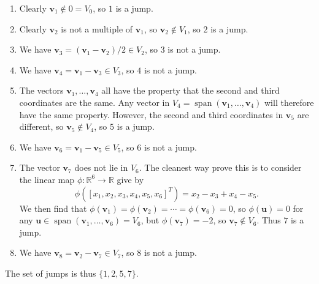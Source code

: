 \documentclass{amsart}
\newcommand{\R}         {{\mathbb{R}}}
\newcommand{\spn}       {\operatorname{span}}
\newcommand{\vu}        {\mathbf{u}}
\newcommand{\vv}        {\mathbf{v}}
\renewcommand{\:}       {\colon}
\theoremstyle{definition}
\renewenvironment{solution}{\SolutionAtEnd}{\endSolutionAtEnd}
\begin{document}
\begin{solution}
 \begin{enumerate}
  \item Clearly $\vv_1\not\in 0=V_0$, so $1$ is a jump.
  \item Clearly $\vv_2$ is not a multiple of $\vv_1$, so
   $\vv_2\not\in V_1$, so $2$ is a jump.
  \item We have $\vv_3=(\vv_1-\vv_2)/2\in V_2$, so $3$ is
   not a jump.
  \item We have $\vv_4=\vv_1-\vv_3\in V_3$, so $4$ is not a jump.
  \item The vectors $\vv_1,\dotsc,\vv_4$ all have the
   property that the second and third coordinates are the
   same.  Any vector in $V_4=\spn(\vv_1,\dotsc,\vv_4)$ will
   therefore have the same property.  However, the second
   and third coordinates in $\vv_5$ are different, so
   $\vv_5\not\in V_4$, so $5$ is a jump.
  \item We have $\vv_6=\vv_1-\vv_5\in V_5$, so $6$ is not a jump.
  \item The vector $\vv_7$ does not lie in $V_6$.  The
   cleanest way  prove this is to consider the linear map
   $\phi\:\R^6\to\R$ give by
   \[ \phi([x_1,x_2,x_3,x_4,x_5,x_6]^T) =
       x_2-x_3+x_4-x_5.
   \]
   We then find that
   $\phi(\vv_1)=\phi(\vv_2)=\dotsb=\phi(\vv_6)=0$, so
   $\phi(\vu)=0$ for any
   $\vu\in\spn(\vv_1,\dotsc,\vv_6)=V_6$, but
   $\phi(\vv_7)=-2$, so $\vv_7\not\in V_6$.  Thus $7$ is a
   jump.
  \item We have $\vv_8=\vv_2-\vv_7\in V_7$, so $8$ is not a jump.
 \end{enumerate}
 The set of jumps is thus $\{1,2,5,7\}$.
\end{solution}
\end{document}
